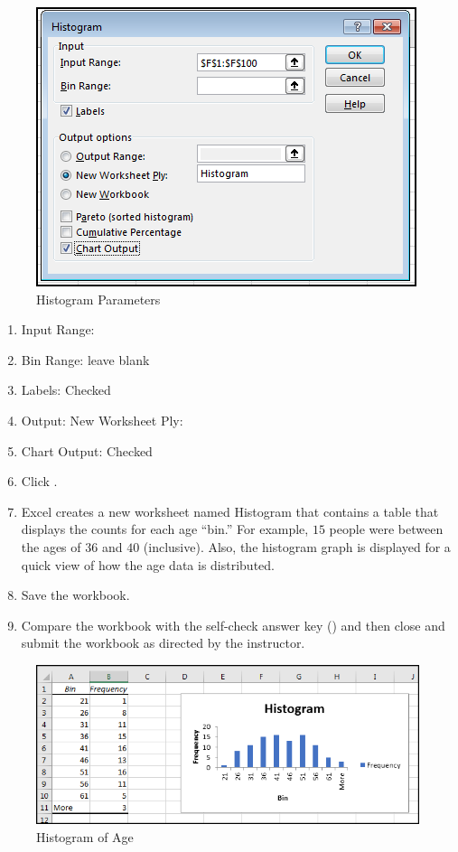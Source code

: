 \begin{figure}[H]
	\centering
	\includegraphics[width=\maxwidth{.75\linewidth}]{gfx/ch09_fig62}
	\caption{Histogram Parameters}
	\label{09:fig62}
\end{figure}

\begin{enumerate}[resume]
	\item Input Range: 
	\item Bin Range: leave blank
	\item Labels: Checked
	\item Output: New Worksheet Ply: 
	\item Chart Output: Checked
	\item Click .
	\item Excel creates a new worksheet named Histogram that contains a table that displays the counts for each age ``bin.'' For example, $ 15 $ people were between the ages of $ 36 $ and $ 40 $ (inclusive). Also, the histogram graph is displayed for a quick view of how the age data is distributed.
	\item Save the  workbook.
	
	\item Compare the workbook with the self-check answer key () and then close and submit the  workbook as directed by the instructor.

\end{enumerate}

\begin{figure}[H]
	\centering
	\includegraphics[width=\maxwidth{.95\linewidth}]{gfx/ch09_fig63}
	\caption{Histogram of Age}
	\label{09:fig63}
\end{figure}


